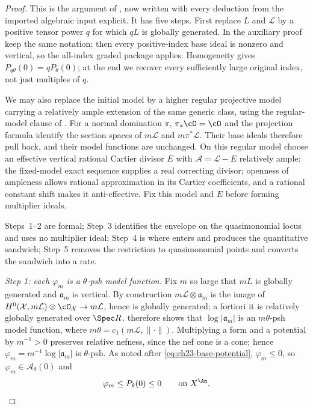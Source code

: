 \begin{proof}
This is the argument of \cite[Theorem~8.5]{BFJ16}, now written with every
deduction from the imported algebraic input explicit.  It has five steps.
First replace $L$ and $\mathcal L$ by a positive tensor power $q$ for
which $qL$ is globally generated.  In the auxiliary proof keep the same
notation; then every positive-index base ideal is nonzero and vertical,
so the all-index graded package applies.  Homogeneity gives
$P_{q\theta}(0)=qP_\theta(0)$; at the end we recover every sufficiently
large original index, not just multiples of $q$.

We may also replace the initial model by a higher regular projective
model carrying a relatively ample extension of the same generic class,
using the regular-model clause of
.  For a normal domination
$\pi$, $\pi_*\cO=\cO$ and the projection formula identify the
section spaces of $m\mathcal L$ and $m\pi^*\mathcal L$.  Their base
ideals therefore pull back, and their model functions are unchanged.
On this regular model choose an effective vertical rational Cartier divisor
$E$ with $\mathcal A=\mathcal L-E$ relatively ample: the fixed-model
exact sequence supplies a real correcting divisor; openness of ampleness
allows rational approximation in its Cartier coefficients, and a rational
constant shift makes it anti-effective.  Fix this model and $E$ before
forming multiplier ideals.

Steps~1--2 are formal; Step~3 identifies the envelope on the quasimonomial
locus and uses no multiplier ideal; Step~4 is where
 enters and produces the
quantitative sandwich; Step~5 removes the restriction to quasimonomial
points and converts the sandwich into a rate.

\emph{Step 1: each $\varphi_m$ is a $\theta$-psh model function.}
Fix $m$ so large that $mL$ is globally generated and
$\mathfrak a_m$ is vertical.  By construction
$m\mathcal L\otimes\mathfrak a_m$ is the image of
$H^0(\mathcal X,m\mathcal L)\otimes\cO_{\mathcal X}\to m\mathcal L$, hence
is globally generated; a fortiori it is relatively globally generated over
$\Spec R$.   therefore shows that
$\log|\mathfrak a_m|$ is an $m\theta$-psh model function, where
$m\theta=c_1(m\mathcal L,\|\cdot\|)$.  Multiplying a form and a potential
by $m^{-1}>0$ preserves relative nefness, since the nef cone is a cone;
hence $\varphi_m=m^{-1}\log|\mathfrak a_m|$ is $\theta$-psh.  As noted
after \eqref{eq:ch23-base-potential}, $\varphi_m\leq0$, so
$\varphi_m\in\mathcal A_\theta(0)$ and
\begin{equation}\label{eq:ch23-varphi-m-below-envelope}
 \varphi_m\leq P_\theta(0)\leq 0
 \qquad\text{on }X^{\An}.
\end{equation}


\end{proof}
